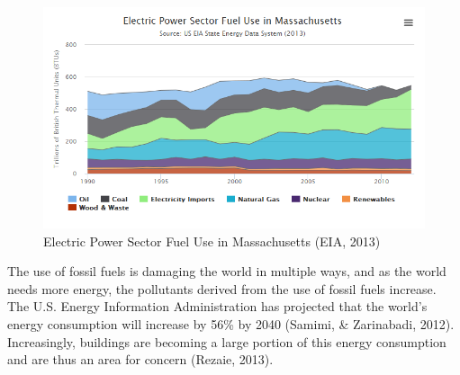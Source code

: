   \begin{figure}[h]
    \centering
      \includegraphics[width=\textwidth]{images/02-ElectricPowerSectorFuelUseinMassachusetts}
    \caption{Electric Power Sector Fuel Use in Massachusetts (EIA, 2013)}
    \label{fig:power}
  \end{figure}
  \par The use of fossil fuels is damaging the world in multiple ways, and as the world needs more energy, the pollutants derived from the use of fossil fuels increase. The U.S. Energy Information Administration has projected that the world's energy consumption will increase by 56\% by 2040 (Samimi, \& Zarinabadi, 2012). Increasingly, buildings are becoming a large portion of this energy consumption and are thus an area for concern (Rezaie, 2013).


